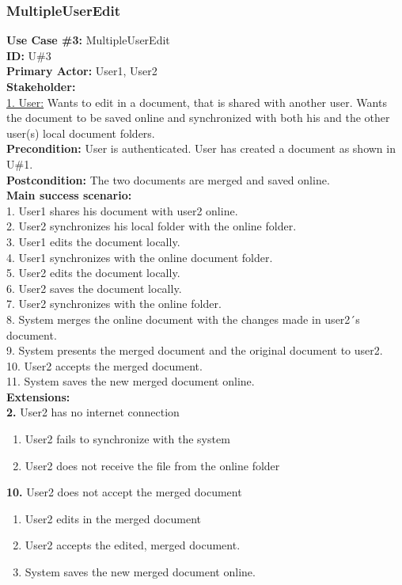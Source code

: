 \subsubsection{MultipleUserEdit}
\textbf{Use Case \#3:} MultipleUserEdit\\
\textbf{ID:} U\#3\\
\textbf{Primary Actor:} User1, User2\\
\textbf{Stakeholder:}\\
\underline{1. User:} Wants to edit in a document, that is shared with another user. Wants the document to be saved online and synchronized with both his and the other user(s) local document folders.\\
\newline
\textbf{Precondition:} User is authenticated. User has created a document as shown in U\#1.\\
\textbf{Postcondition:} The two documents are merged and saved online.\\
\newline
\textbf{Main success scenario:}\\
1. User1 shares his document with user2 online.\\
2. User2 synchronizes his local folder with the online folder.\\
3. User1 edits the document locally.\\
4. User1 synchronizes with the online document folder.\\
5. User2 edits the document locally.\\
6. User2 saves the document locally.\\
7. User2 synchronizes with the online folder.\\
8. System merges the online document with the changes made in user2´s document.\\
9. System presents the merged document and the original document to user2.\\
10. User2 accepts the merged document.\\
11. System saves the new merged document online.\\
\newline
\textbf{Extensions:}\\
\textbf{2.} User2 has no internet connection
\begin{enumerate}
\item User2 fails to synchronize with the system
\item User2 does not receive the file from the online folder
\end{enumerate}
\textbf{10.} User2 does not accept the merged document
\begin{enumerate}
\item User2 edits in the merged document
\item User2 accepts the edited, merged document.
\item System saves the new merged document online.
\end{enumerate}

